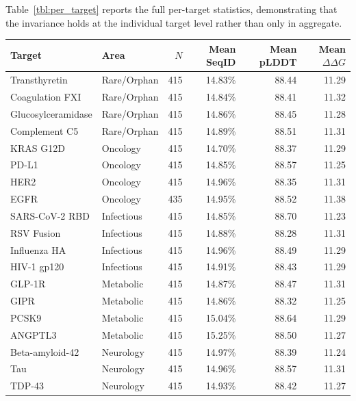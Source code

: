 Table~\ref{tbl:per_target} reports the full per-target statistics,
demonstrating that the invariance holds at the individual target level
rather than only in aggregate.

\begin{table}[h!]
\centering
\small
\renewcommand{\arraystretch}{1.1}
\begin{tabular}{@{} l l r r r r @{}}
\toprule
\textbf{Target} & \textbf{Area} & $N$ & \textbf{Mean SeqID} & \textbf{Mean pLDDT} & \textbf{Mean $\Delta\Delta G$} \\
\midrule
Transthyretin      & Rare/Orphan & 415 & 14.83\% & 88.44 & 11.29 \\
Coagulation FXI    & Rare/Orphan & 415 & 14.84\% & 88.41 & 11.32 \\
Glucosylceramidase & Rare/Orphan & 415 & 14.86\% & 88.45 & 11.28 \\
Complement C5      & Rare/Orphan & 415 & 14.89\% & 88.51 & 11.31 \\
\midrule
KRAS G12D          & Oncology    & 415 & 14.70\% & 88.37 & 11.29 \\
PD-L1              & Oncology    & 415 & 14.85\% & 88.57 & 11.25 \\
HER2               & Oncology    & 415 & 14.96\% & 88.35 & 11.31 \\
EGFR               & Oncology    & 435 & 14.95\% & 88.52 & 11.38 \\
\midrule
SARS-CoV-2 RBD     & Infectious  & 415 & 14.85\% & 88.70 & 11.23 \\
RSV Fusion         & Infectious  & 415 & 14.88\% & 88.28 & 11.31 \\
Influenza HA       & Infectious  & 415 & 14.96\% & 88.49 & 11.29 \\
HIV-1 gp120        & Infectious  & 415 & 14.91\% & 88.43 & 11.29 \\
\midrule
GLP-1R             & Metabolic   & 415 & 14.87\% & 88.47 & 11.31 \\
GIPR               & Metabolic   & 415 & 14.86\% & 88.32 & 11.25 \\
PCSK9              & Metabolic   & 415 & 15.04\% & 88.64 & 11.29 \\
ANGPTL3            & Metabolic   & 415 & 15.25\% & 88.50 & 11.27 \\
\midrule
Beta-amyloid-42    & Neurology   & 415 & 14.97\% & 88.39 & 11.24 \\
Tau                & Neurology   & 415 & 14.96\% & 88.57 & 11.31 \\
TDP-43             & Neurology   & 415 & 14.93\% & 88.42 & 11.27 \\

\end{tabular}
\end{table}
